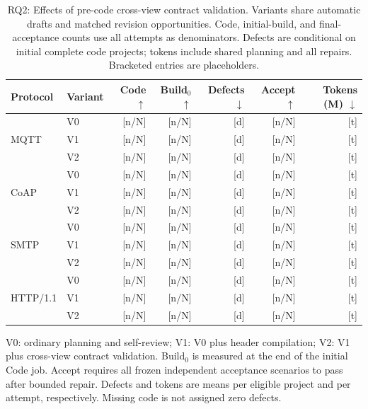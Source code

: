 
\begin{table}[t]
\caption{RQ2: Effects of pre-code cross-view contract validation.
Variants share automatic drafts and matched revision opportunities.
Code, initial-build, and final-acceptance counts use all attempts as denominators.
Defects are conditional on initial complete code projects; tokens include
shared planning and all repairs. Bracketed entries are placeholders.}
\label{tab:rq2-cross-view-validation}
\centering
\small
\begin{tabular}{llrrrrr}
\toprule
Protocol & Variant & Code $\uparrow$ & Build$_0$ $\uparrow$ & Defects $\downarrow$ & Accept $\uparrow$ & Tokens (M) $\downarrow$ \\
\midrule
\multirow{3}{*}{MQTT}
 & V0 & [n/N] & [n/N] & [d] & [n/N] & [t] \\
 & V1 & [n/N] & [n/N] & [d] & [n/N] & [t] \\
 & V2 & [n/N] & [n/N] & [d] & [n/N] & [t] \\
\midrule
\multirow{3}{*}{CoAP}
 & V0 & [n/N] & [n/N] & [d] & [n/N] & [t] \\
 & V1 & [n/N] & [n/N] & [d] & [n/N] & [t] \\
 & V2 & [n/N] & [n/N] & [d] & [n/N] & [t] \\
\midrule
\multirow{3}{*}{SMTP}
 & V0 & [n/N] & [n/N] & [d] & [n/N] & [t] \\
 & V1 & [n/N] & [n/N] & [d] & [n/N] & [t] \\
 & V2 & [n/N] & [n/N] & [d] & [n/N] & [t] \\
\midrule
\multirow{3}{*}{HTTP/1.1}
 & V0 & [n/N] & [n/N] & [d] & [n/N] & [t] \\
 & V1 & [n/N] & [n/N] & [d] & [n/N] & [t] \\
 & V2 & [n/N] & [n/N] & [d] & [n/N] & [t] \\
\bottomrule
\end{tabular}

\smallskip
\begin{minipage}{\textwidth}
\footnotesize
V0: ordinary planning and self-review; V1: V0 plus header compilation;
V2: V1 plus cross-view contract validation.
Build$_0$ is measured at the end of the initial Code job.
Accept requires all frozen independent acceptance scenarios to pass after
bounded repair. Defects and tokens are means per eligible project and per
attempt, respectively. Missing code is not assigned zero defects.
\end{minipage}
\end{table}
